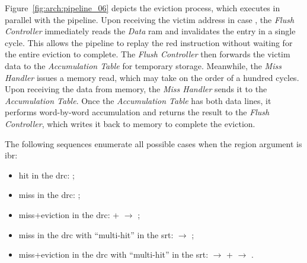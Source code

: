 Figure~\ref{fig:arch:pipeline_06} depicts the \gls{eviction} process, which executes in parallel with the \gls{pipeline}.
Upon receiving the victim address in case , the \textit{Flush Controller} immediately reads the \textit{Data} \acrshort{ram} and invalidates the entry in a single cycle.
This allows the \gls{pipeline} to replay the \acrshort{red} instruction without waiting for the entire \gls{eviction} to complete.
The \textit{Flush Controller} then forwards the victim data to the \textit{Accumulation Table} for temporary storage.
Meanwhile, the \textit{Miss Handler} issues a memory read, which may take on the order of a hundred cycles.
Upon receiving the data from memory, the \textit{Miss Handler} sends it to the \textit{Accumulation Table}.
Once the \textit{Accumulation Table} has both data lines, it performs word-by-word accumulation and returns the result to the \textit{Flush Controller}, which writes it back to memory to complete the \gls{eviction}.

\noindent The following sequences enumerate all possible cases when the region argument is \acrshort{ibr}:
\begin{itemize}
    \item \gls{hit} in the \acrshort{drc}: ;
    \item \gls{miss} in the \acrshort{drc}: ;
    \item \gls{miss}+\gls{eviction} in the \acrshort{drc}:  +  $\rightarrow$ ;
    \item \gls{miss} in the \acrshort{drc} with ``multi-\gls{hit}'' in the \acrshort{srt}:  $\rightarrow$ ;
    \item \gls{miss}+\gls{eviction} in the \acrshort{drc} with ``multi-\gls{hit}'' in the \acrshort{srt}:  $\rightarrow$  +  $\rightarrow$ .
\end{itemize}
\bigskip

